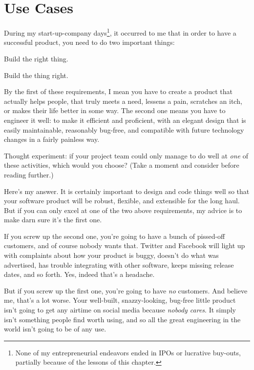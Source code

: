 
\chapter{Use Cases}

During my start-up-company days\footnote{None of my entrepreneurial endeavors
ended in IPOs or lucrative buy-outs, partially because of the lessons of this
chapter.}, it occurred to me that in order to have a successful product, you
need to do two important things:

\begin{compactenum}
\item Build the right thing.
\item Build the thing right.
\end{compactenum}

By the first of these requirements, I mean you have to create a product that
actually helps people, that truly meets a need, lessens a pain, scratches an
itch, or makes their life better in some way. The second one means you have to
engineer it well: to make it efficient and proficient, with an elegant design
that is easily maintainable, reasonably bug-free, and compatible with future
technology changes in a fairly painless way.

Thought experiment: if your project team could only manage to do well at
\textit{one} of these activities, which would you choose? (Take a moment and
consider before reading further.)

Here's my answer. It is certainly important to design and code things well so
that your software product will be robust, flexible, and extensible for the
long haul. But if you can only excel at one of the two above requirements, my
advice is to make darn sure it's the first one.

If you screw up the second one, you're going to have a bunch of pissed-off
customers, and of course nobody wants that. Twitter and Facebook will light up
with complaints about how your product is buggy, doesn't do what was
advertised, has trouble integrating with other software, keeps missing release
dates, and so forth. Yes, indeed that's a headache.

But if you screw up the first one, you're going to have \textit{no} customers.
And believe me, that's a lot worse. Your well-built, snazzy-looking, bug-free
little product isn't going to get any airtime on social media because
\textit{nobody cares}. It simply isn't something people find worth using, and
so all the great engineering in the world isn't going to be of any use.


